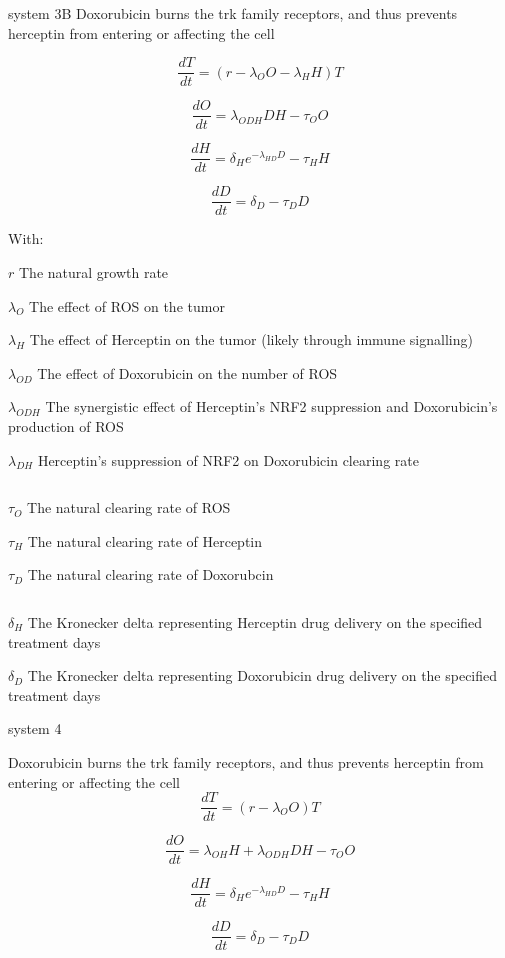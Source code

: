 \documentclass{article}
\begin{document}
system 3B
Doxorubicin burns the trk family receptors, and thus prevents herceptin from entering or affecting the cell



$$ \frac{dT}{dt} = (r - \lambda_O O - \lambda_H H ) T $$


$$ \frac{dO}{dt} = \lambda_{ODH} D H - \tau_O O $$


$$ \frac{dH}{dt} = \delta_He^{-\lambda_{HD}D} - \tau_H H $$


$$ \frac{dD}{dt} = \delta_D - \tau_D D$$

With:


$ r $ The natural growth rate

$ \lambda_O $ The effect of ROS on the tumor 

$ \lambda_H $ The effect of Herceptin on the tumor (likely through immune signalling) 

$ \lambda_{OD} $ The effect of Doxorubicin on the number of ROS

$ \lambda_{ODH} $ The synergistic effect of Herceptin's NRF2 suppression and Doxorubicin's production of ROS

$ \lambda_{DH} $ Herceptin's suppression of NRF2 on Doxorubicin clearing rate 

$$
\;
\;
$$


$ \tau_O $ The natural clearing rate of ROS

$ \tau_H $ The natural clearing rate of Herceptin

$ \tau_D $ The natural clearing rate of Doxorubcin

$$
\;
\;
$$


$ \delta_H $ The Kronecker delta representing Herceptin drug delivery on the specified treatment days

$ \delta_D $ The Kronecker delta representing Doxorubicin drug delivery on the specified treatment days





system 4

Doxorubicin burns the trk family receptors, and thus prevents herceptin from entering or affecting the cell
$$ \frac{dT}{dt} = (r - \lambda_O O) T $$


$$ \frac{dO}{dt} = \lambda_{OH} H + \lambda_{ODH} D H - \tau_O O $$


$$ \frac{dH}{dt} = \delta_He^{-\lambda_{HD}D} - \tau_H H $$


$$ \frac{dD}{dt} = \delta_D - \tau_D D $$
\end{document}
